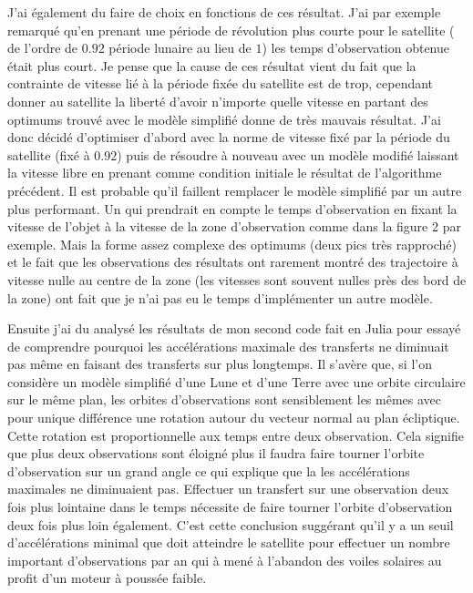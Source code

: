 \documentclass{article} %
\begin{document}
		J'ai également du faire de choix en fonctions de ces résultat. J'ai par exemple remarqué qu'en prenant une période de révolution plus courte pour le satellite ( de l'ordre de $0.92$ période lunaire au lieu de $1$) les temps d'observation obtenue était plus court. Je pense que la cause de ces résultat vient du fait que la contrainte de vitesse lié à la période fixée du satellite est de trop, cependant donner au satellite la liberté d'avoir n'importe quelle vitesse en partant des optimums trouvé avec le modèle simplifié donne de très mauvais résultat. J'ai donc décidé d'optimiser d'abord avec la norme de vitesse fixé par la période du satellite (fixé à $0.92$) puis de résoudre à nouveau avec un modèle modifié laissant la vitesse libre en prenant comme condition initiale le résultat de l'algorithme précédent. Il est probable qu'il faillent remplacer le modèle simplifié par un autre plus performant. Un qui prendrait en compte le temps d'observation en fixant la vitesse de l'objet à la vitesse de la zone d'observation comme dans la figure 2 par exemple. Mais la forme assez complexe des optimums (deux pics très rapproché) et le fait que les observations des résultats ont rarement montré des trajectoire à vitesse nulle au centre de la zone (les vitesses sont souvent nulles près des bord de la zone) ont fait que je n'ai pas eu le temps d'implémenter un autre modèle.
		
		Ensuite j'ai du analysé les résultats de mon second code fait en Julia pour essayé de comprendre pourquoi les accélérations maximale des transferts ne diminuait pas même en faisant des transferts sur plus longtemps.
		Il s'avère que, si l'on considère un modèle simplifié d'une Lune et d'une Terre avec une orbite circulaire sur le même plan, les orbites d'observations sont sensiblement les mêmes avec pour unique différence une rotation autour du vecteur normal au plan écliptique. Cette rotation est proportionnelle aux temps entre deux observation. Cela signifie que plus deux observations sont éloigné plus il faudra faire tourner l'orbite d'observation sur un grand angle ce qui explique que la les accélérations maximales ne diminuaient pas. Effectuer un transfert sur une observation deux fois plus lointaine dans le temps nécessite de faire tourner l'orbite d'observation deux fois plus loin également. C'est cette conclusion suggérant qu'il y a un seuil d'accélérations minimal que doit atteindre le satellite pour effectuer un nombre important d'observations par an qui à mené à l'abandon des voiles solaires au profit d'un moteur à poussée faible.
		
\end{document}
